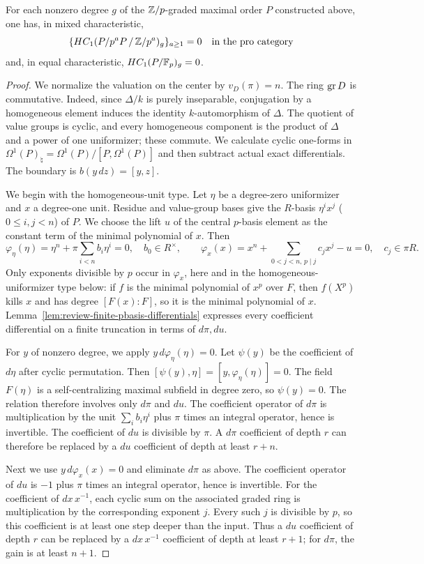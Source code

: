 \begin{lemma}
\label{lem:review-nonzero-hc-one}
For each nonzero degree $g$ of the $\mathbb Z/p$-graded maximal order $P$ constructed above, one has, in mixed characteristic,
\[
 \{HC_1(P/p^aP\,/\,\mathbb Z/p^a)_g\}_{a\ge1}=0
 \quad\text{in the pro category}
\]
and, in equal characteristic, $HC_1(P/\mathbb F_p)_g=0$.
\end{lemma}
\begin{proof}
We normalize the valuation on the center by $v_D(\pi)=n$.
The ring $\operatorname{gr} D$ is commutative.
Indeed, since $\Delta/k$ is purely inseparable, conjugation by a homogeneous element induces the identity $k$-automorphism of $\Delta$.
The quotient of value groups is cyclic, and every homogeneous component is the product of $\Delta$ and a power of one uniformizer; these commute.
We calculate cyclic one-forms in $\Omega^1(P)_\natural=\Omega^1(P)/[P,\Omega^1(P)]$ and then subtract actual exact differentials.
The boundary is $b(y\,dz)=[y,z]$.

We begin with the homogeneous-unit type.
Let $\eta$ be a degree-zero uniformizer and $x$ a degree-one unit.
Residue and value-group bases give the $R$-basis $\eta^i x^j$ ($0\le i,j<n$) of $P$.
We choose the lift $u$ of the central $p$-basis element as the constant term of the minimal polynomial of $x$.
Then
\[
 \varphi_\eta(\eta)=\eta^n+\pi\sum_{i<n}b_i\eta^i=0,
 \quad b_0\in R^\times,\qquad
 \varphi_x(x)=x^n+\sum_{0<j<n,\,p\mid j}c_jx^j-u=0,
 \quad c_j\in\pi R.
\]
Only exponents divisible by $p$ occur in $\varphi_x$, here and in the homogeneous-uniformizer type below: if $f$ is the minimal polynomial of $x^p$ over $F$, then $f(X^p)$ kills $x$ and has degree $[F(x):F]$, so it is the minimal polynomial of $x$.
Lemma~\ref{lem:review-finite-pbasis-differentials} expresses every coefficient differential on a finite truncation in terms of $d\pi,du$.

For $y$ of nonzero degree, we apply $y\,d\varphi_\eta(\eta)=0$.
Let $\psi(y)$ be the coefficient of $d\eta$ after cyclic permutation.
Then $[\psi(y),\eta]=[y,\varphi_\eta(\eta)]=0$.
The field $F(\eta)$ is a self-centralizing maximal subfield in degree zero, so $\psi(y)=0$.
The relation therefore involves only $d\pi$ and $du$.
The coefficient operator of $d\pi$ is multiplication by the unit $\sum_i b_i\eta^i$ plus $\pi$ times an integral operator, hence is invertible.
The coefficient of $du$ is divisible by $\pi$.
A $d\pi$ coefficient of depth $r$ can therefore be replaced by a $du$ coefficient of depth at least $r+n$.

Next we use $y\,d\varphi_x(x)=0$ and eliminate $d\pi$ as above.
The coefficient operator of $du$ is $-1$ plus $\pi$ times an integral operator, hence is invertible.
For the coefficient of $dx\,x^{-1}$, each cyclic sum on the associated graded ring is multiplication by the corresponding exponent $j$.
Every such $j$ is divisible by $p$, so this coefficient is at least one step deeper than the input.
Thus a $du$ coefficient of depth $r$ can be replaced by a $dx\,x^{-1}$ coefficient of depth at least $r+1$; for $d\pi$, the gain is at least $n+1$.


\end{proof}
